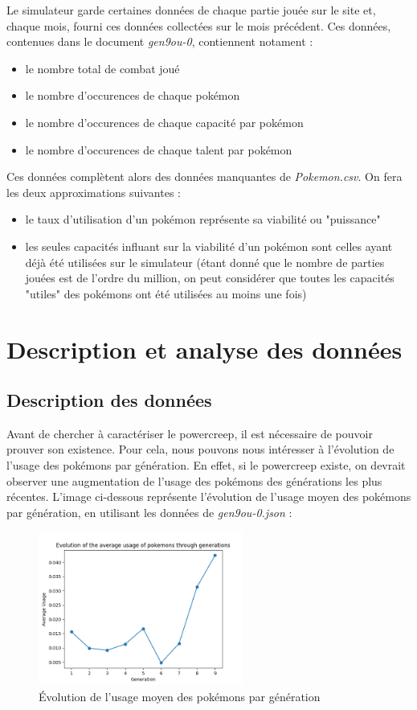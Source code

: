 \documentclass[a4paper,12pt]{article}
\begin{document}
Le simulateur garde certaines données de chaque partie jouée sur le site et,
chaque mois, fourni ces données collectées sur le mois précédent. Ces données,
contenues dans le document \textit{gen9ou-0}, contiennent notament :
\begin{itemize}
    \item le nombre total de combat joué
    \item le nombre d'occurences de chaque pokémon
    \item le nombre d'occurences de chaque capacité par pokémon
    \item le nombre d'occurences de chaque talent par pokémon
\end{itemize}
Ces données complètent alors des données manquantes de \textit{Pokemon.csv}. On
fera les deux approximations suivantes :
\begin{itemize}
    \item le taux d'utilisation d'un pokémon représente sa viabilité ou
    "puissance"
    \item les seules capacités influant sur la viabilité d'un pokémon sont
    celles ayant déjà été utilisées sur le simulateur (étant donné que le nombre
    de parties jouées est de l'ordre du million, on peut considérer que toutes
    les capacités "utiles" des pokémons ont été utilisées au moins une fois)
\end{itemize}
\section{Description et analyse des données}
\subsection{Description des données}
Avant de chercher à caractériser le powercreep, il est nécessaire de pouvoir
prouver son existence. Pour cela, nous pouvons nous intéresser à l'évolution de
l'usage des pokémons par génération. En effet, si le powercreep existe, on
devrait observer une augmentation de l'usage des pokémons des générations les
plus récentes. L'image ci-dessous représente l'évolution de l'usage moyen des
pokémons par génération, en utilisant les données de \textit{gen9ou-0.json} :
\begin{figure}[!h]
    \centering
    \includegraphics[width=0.6\textwidth]{Image/avg_usage_by_generation.png}
    \caption{Évolution de l'usage moyen des pokémons par génération}
    \label{fig:image4}
\end{figure}
\end{document}
